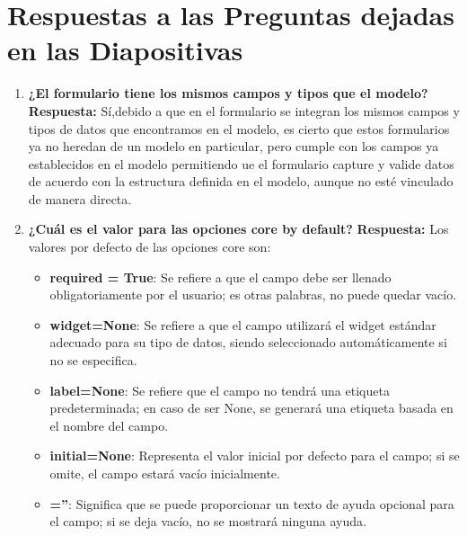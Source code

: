 \documentclass{article}
\begin{document}
	\section{Respuestas a las Preguntas dejadas en las Diapositivas}
  \begin{enumerate}
    \item \textbf{¿El formulario tiene los mismos campos y tipos que el modelo?}
      \newline
      \textbf{Respuesta: }Sí,debido a que en el formulario se integran los mismos campos y tipos de datos que encontramos en el modelo, 
      es cierto que estos formularios ya no heredan de un modelo en particular, pero cumple con los campos ya establecidos en el modelo 
      permitiendo ue el formulario capture y valide datos de acuerdo con la estructura definida en el modelo, aunque no esté vinculado de manera directa.
    \item \textbf{¿Cuál es el valor para las opciones core by default?}
      \newline
      \textbf{Respuesta: }Los valores por defecto de las opciones core son: 
      \begin{itemize}
        \item \textbf{required = True}: Se refiere a que el campo debe ser llenado obligatoriamente por el usuario; es otras palabras, 
        no puede quedar vacío.
        \item \textbf{widget=None}: Se refiere a que el campo utilizará el widget estándar adecuado para su tipo de datos, siendo seleccionado 
        automáticamente si no se especifica.
        \item \textbf{label=None}: Se refiere que el campo no tendrá una etiqueta predeterminada; en caso de ser None, se generará una etiqueta 
        basada en el nombre del campo.
        \item \textbf{initial=None}: Representa el valor inicial por defecto para el campo; si se omite, el campo estará vacío inicialmente.
        \item \textbf{=''}: Significa que se puede proporcionar un texto de ayuda opcional para el campo; si se deja vacío, no se mostrará ninguna ayuda.
      \end{itemize}
  \end{enumerate}

\end{document}
